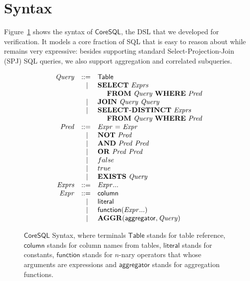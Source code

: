 \section{Syntax}

Figure~\ref{tab:sql-syntax} shows the syntax of $\mathsf{CoreSQL}$, the DSL that we developed for verification. It models a core fraction of SQL that is easy to reason about while remains very expressive: besides supporting standard
Select-Projection-Join (SPJ) SQL queries, we also support aggregation and correlated subqueries.  

\begin{figure}[t]
\centering
\[
\begin{array}{rcl}
  \mathit{Query} & ::=  &  \mathsf{Table} \\
        & \; \mid & \mathbf{SELECT}~\mathit{Exprs}\\
        && ~~~~\mathbf{FROM}~\mathit{Query}~\mathbf{WHERE}~\mathit{Pred}\\ 
        & \; \mid  & \mathbf{JOIN}~\mathit{Query}~\mathit{Query}        \\
        & \; \mid & \mathbf{SELECT\texttt{\footnotesize -}DISTINCT}~\mathit{Exprs}\\
        & & ~~~~\mathbf{FROM}~\mathit{Query}~\mathbf{WHERE}~\mathit{Pred}\\ 
  \mathit{Pred} & ::= & \mathit{Expr} ~ \mathbf{=}~\mathit{Expr} \\
       & \; \mid &  \mathbf{NOT} ~ \mathit{Pred}      \\
       & \; \mid & \mathbf{AND}~ \mathit{Pred} ~ \mathit{Pred}      \\ 
       & \; \mid & \mathbf{OR} ~ \mathit{Pred} ~ \mathit{Pred} \\
       & \; \mid & false \\
       & \; \mid & true  \\
       & \; \mid & \mathbf{EXISTS} ~ \mathit{Query} \\
  \mathit{Exprs} & ::= & \mathit{Expr}...                     \\
  \mathit{Expr} & ::= & \mathsf{column}                     \\
        & \; \mid & \mathsf{literal}                  \\
        & \; \mid & \mathsf{function}(\mathit{Expr}...)     \\
        & \; \mid & \mathbf{AGGR}(\mathsf{aggregator}, \mathit{Query})  \\  
\end{array}
\]
\caption{$\mathsf{CoreSQL}$ Syntax, where terminals $\mathsf{Table}$ stands for table reference,  $\mathsf{column}$ stands for column names from tables, $\mathsf{literal}$ stands for constants, $\mathsf{function}$ stands for $n$-nary operators that whose arguments are expressions and $\mathsf{aggregator}$ stands for aggregation functions.}
\label{tab:sql-syntax}
\end{figure}


